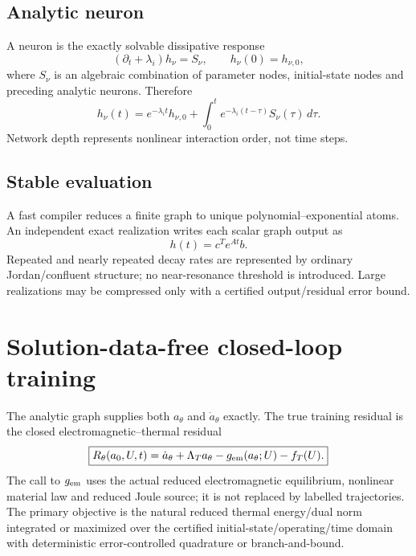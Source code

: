 \documentclass[11pt]{article}
\theoremstyle{remark}
\begin{document}
\subsection{Analytic neuron}
A neuron is the exactly solvable dissipative response
\begin{equation}
(\partial_t+\lambda_i)h_\nu=S_\nu,
\qquad
h_\nu(0)=h_{\nu,0},
\label{eq:analytic_neuron}
\end{equation}
where \(S_\nu\) is an algebraic combination of parameter nodes, initial-state nodes and preceding analytic neurons. Therefore
\[
h_\nu(t)=e^{-\lambda_it}h_{\nu,0}
+\int_0^te^{-\lambda_i(t-\tau)}S_\nu(\tau)\,d\tau.
\]
Network depth represents nonlinear interaction order, not time steps.

\subsection{Stable evaluation}
A fast compiler reduces a finite graph to unique polynomial--exponential atoms. An independent exact realization writes each scalar graph output as
\begin{equation}
\boxed{h(t)=c^Te^{At}b.}
\label{eq:state_space_realization}
\end{equation}
Repeated and nearly repeated decay rates are represented by ordinary Jordan/confluent structure; no near-resonance threshold is introduced. Large realizations may be compressed only with a certified output/residual error bound.

\section{Solution-data-free closed-loop training}

The analytic graph supplies both \(a_\theta\) and \(\dot a_\theta\) exactly. The true training residual is the closed electromagnetic--thermal residual
\begin{equation}
\boxed{
R_\theta(a_0,U,t)
=\dot a_\theta+\Lambda_Ta_\theta
-g_{\rm em}(a_\theta;U)-f_T(U).
}
\label{eq:nn_residual}
\end{equation}
The call to \(g_{\rm em}\) uses the actual reduced electromagnetic equilibrium, nonlinear material law and reduced Joule source; it is not replaced by labelled trajectories. The primary objective is the natural reduced thermal energy/dual norm integrated or maximized over the certified initial-state/operating/time domain with deterministic error-controlled quadrature or branch-and-bound.
\end{document}
